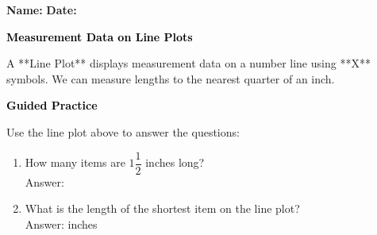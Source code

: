 \documentclass[12pt, letterpaper, fleqn]{article}
\newcommand{\blank}{\underline{\hspace{2.2cm}}}
\begin{document}
\textbf{Name:} \underline{\hspace{5cm}}
\hfill
\textbf{Date:} \underline{\hspace{3cm}}\\

\begin{tcolorbox}[colback=customteal!20]
    \large\textcolor{black}{\textbf{Measurement Data on Line Plots}}
\end{tcolorbox}

\vspace{3mm}
\noindent
A **Line Plot** displays measurement data on a number line using **X** symbols.
We can measure lengths to the nearest quarter of an inch.

\begin{center}
\end{center}

\newpage
\begin{tcolorbox}[colback=customteal!20]
    \large\textcolor{black}{\textbf{Guided Practice}}
\end{tcolorbox}

\vspace{5mm}
\noindent
Use the line plot above to answer the questions:

\vspace{8mm}
\begin{enumerate}[itemsep=2.5cm, leftmargin=0.6cm]
\item How many items are $1\dfrac{1}{2}$ inches long?
\\
Answer: \blank

\item What is the length of the shortest item on the line plot?
\\
Answer: \blank inches
\end{enumerate}
\end{document}
